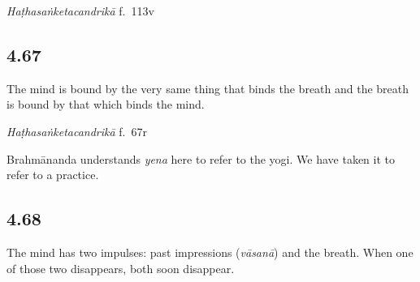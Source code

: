 \begin{ekdosis}
\begin{testimonia}[hp04_066]
\emph{Haṭhasaṅketacandrikā} f.~113v
\begin{versinnote}
\end{versinnote}
\end{testimonia}


\subsection*{4.67}
\begin{translation}[hp04_067]
The mind is bound by the very same thing that binds the breath and the breath is bound by that which binds the mind.
\end{translation}


\begin{testimonia}[hp04_067]

\emph{Haṭhasaṅketacandrikā} f.~67r
\begin{versinnote}
\end{versinnote}
\end{testimonia}

\begin{philcomm}[hp04_067]
Brahmānanda understands \emph{yena} here to refer to the yogi. We have taken it to refer to a practice.
\end{philcomm}

\subsection*{4.68}
\begin{translation}[hp04_068]
The mind has two impulses: past impressions (\emph{vāsanā}) and the breath. When one of those two disappears, both soon disappear.%
\end{translation}


\end{ekdosis}
